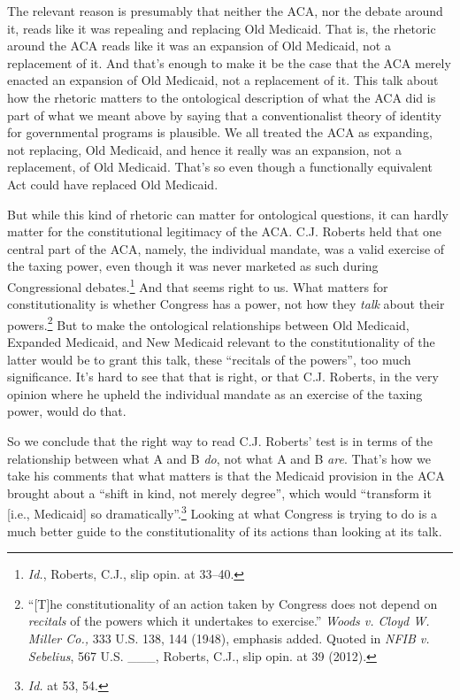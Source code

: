 The relevant reason is presumably that neither the ACA, nor the debate around it, reads like it was repealing and replacing Old Medicaid. That is, the rhetoric around the ACA reads like it was an expansion of Old Medicaid, not a replacement of it. And that's enough to make it be the case that the ACA merely enacted an expansion of Old Medicaid, not a replacement of it. This talk about how the rhetoric matters to the ontological description of what the ACA did is part of what we meant above by saying that a conventionalist theory of identity for governmental programs is plausible. We all treated the ACA as expanding, not replacing, Old Medicaid, and hence it really was an expansion, not a replacement, of Old Medicaid. That's so even though a functionally equivalent Act could have replaced Old Medicaid.

But while this kind of rhetoric can matter for ontological questions, it can hardly matter for the constitutional legitimacy of the ACA. C.J. Roberts held that one central part of the ACA, namely, the individual mandate, was a valid exercise of the taxing power, even though it was never marketed as such during Congressional debates.\footnote{\emph{Id.}, Roberts, C.J., slip opin. at 33--40.} And that seems right to us. What matters for constitutionality is whether Congress has a power, not how they \emph{talk} about their powers.\footnote{``[T]he constitutionality of an action taken by Congress does not depend on \emph{recitals} of the powers which it undertakes to exercise.'' \emph{Woods v. Cloyd W. Miller Co., }333 U.S. 138, 144 (1948), emphasis added. Quoted in \emph{NFIB v. Sebelius}, 567 U.S. \_\_\_, Roberts, C.J., slip opin. at 39 (2012).} But to make the ontological relationships between Old Medicaid, Expanded Medicaid, and New Medicaid relevant to the constitutionality of the latter would be to grant this talk, these ``recitals of the powers'', too much significance. It's hard to see that that is right, or that C.J. Roberts, in the very opinion where he upheld the individual mandate as an exercise of the taxing power, would do that.

So we conclude that the right way to read C.J. Roberts' test is in terms of the relationship between what A and B \emph{do}, not what A and B \emph{are}. That's how we take his comments that what matters is that the Medicaid provision in the ACA brought about a ``shift in kind, not merely degree'', which would ``transform it [i.e., Medicaid] so dramatically''.\footnote{\emph{Id.} at 53, 54.} Looking at what Congress is trying to do is a much better guide to the constitutionality of its actions than looking at its talk.

